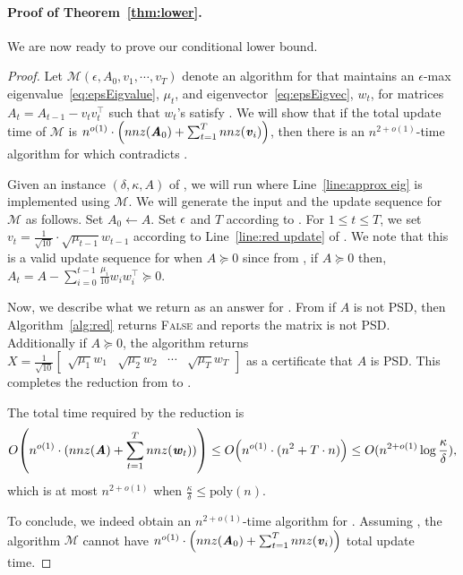 \documentclass[11pt]{article}
\newcommand\poly{\mathrm{poly}}  \newcommand{\comp}[1]{\overline{#1}}
\newcommand\calM{\mathcal{M}}
\let\originalleft\left
\let\originalright\right
\renewcommand{\left}{\mathopen{}\mathclose\bgroup\originalleft}
\renewcommand{\right}{\aftergroup\egroup\originalright}
\newcommand\vv{\boldsymbol{\mathit{v}}}
\newcommand\ww{\boldsymbol{\mathit{w}}}
\renewcommand\AA{\boldsymbol{\mathit{A}}}
\newcommand\XX{\boldsymbol{\mathit{X}}}
\begin{document}
\paragraph{Proof of Theorem~\ref{thm:lower}.} 
We are now ready to prove our conditional lower bound.
\begin{proof} 
Let $\calM(\epsilon,\AA_0,\vv_1,\cdots,\vv_T)$ denote an algorithm for  that maintains an $\epsilon$-max eigenvalue~\eqref{eq:epsEigvalue}, $\mu_t$, and eigenvector~\eqref{eq:epsEigvec}, $\ww_t$, for matrices $\AA_t = \AA_{t-1}-\vv_t\vv_t^{\top}$ such that $\ww_t$'s satisfy . We will show that if the total update time of $\calM$ is $n^{o(1)}\cdot \left(nnz(\AA_0) + \sum_{t=1}^T nnz(\vv_i)\right)$, then there is an $n^{2+o(1)}$-time algorithm for  which contradicts .


Given an instance $(\delta,\kappa,\AA)$ of , 
we will run  where Line~\ref{line:approx eig} is implemented using $\calM$. We will generate the input and the update sequence for $\calM$ as follows.
Set $\AA_0 \gets \AA$. Set $\epsilon$ and $T$ according to . For $1\le t\le T$, we set $\vv_t = \frac{1}{\sqrt{10}}\cdot \sqrt{\mu_{t-1}} \ww_{t-1}$ according to Line~\ref{line:red update} of . We note that this is a valid update sequence for  when $\AA\succeq 0$ since from , 
 if $\AA\succeq 0$ then, $\AA_t = \AA - \sum_{i=0}^{t-1}\frac{\mu_i}{10}\ww_i\ww_i^{\top}\succeq 0$. 

Now, we describe what we return as an answer for .  From  if $\AA$ is not PSD, then Algorithm~\ref{alg:red} returns \textsc{False} and reports the matrix is not PSD. Additionally if $\AA\succeq 0$, the algorithm returns $\XX=\frac{1}{\sqrt{10}}\begin{bmatrix}\sqrt{\mu_1}\ww_1 & \sqrt{\mu_2}\ww_2 & \cdots & \sqrt{\mu_T}\ww_T\end{bmatrix}$ as a certificate that $\AA$ is PSD. This completes the reduction from  to .

The total time required by the reduction is 
\[
O\left(n^{o(1)}\cdot (nnz(\AA) + \sum_{t=1}^T nnz(\ww_t))\right) \leq O\left(n^{o(1)}\cdot (n^2 + T\cdot n)\right) \leq O(n^{2+o(1)}\log\frac{\kappa}{\delta}),
\]
which is at most $n^{2+o(1)}$ when $\frac{\kappa}{\delta} \leq \poly(n)$. 

To conclude, we indeed obtain an $n^{2+o(1)}$-time algorithm for . Assuming , the algorithm $\calM$ cannot have $n^{o(1)}\cdot \left(nnz(\AA_0) + \sum_{t=1}^T nnz(\vv_i)\right)$ total update time.
\end{proof}
\end{document}
